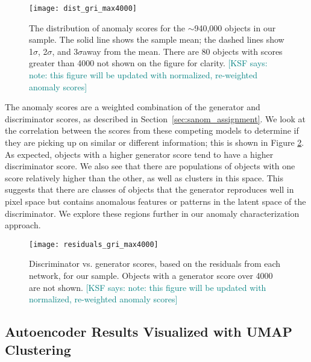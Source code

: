 \documentclass[fleqn,usenatbib,useAMS]{mnras}
\newcommand{\sig}{$\sigma$} %
\newcommand{\KSF}[1]{\textcolor{teal}{{[KSF says: #1]}}}
\begin{document}
\begin{figure}
    \centering
    \texttt{[image: dist\_gri\_max4000]}
    \caption{The distribution of anomaly scores for the $\sim$940,000 objects in our sample. The solid line shows the sample mean; the dashed lines show 1\sig, 2\sig, and 3\sig away from the mean. There are 80 objects with scores greater than 4000 not shown on the figure for clarity. \KSF{note: this figure will be updated with normalized, re-weighted anomaly scores}}
    \label{fig:dist}
\end{figure}

The anomaly scores are a weighted combination of the generator and discriminator scores, as described in Section~\ref{sec:sanom_assignment}.
We look at the correlation between the scores from these competing models to determine if they are picking up on similar or different information; this is shown in Figure \ref{fig:gendisc}.
As expected, objects with a higher generator score tend to have a higher discriminator score.
We also see that there are populations of objects with one score relatively higher than the other, as well as clusters in this space.
This suggests that there are classes of objects that the generator reproduces well in pixel space but contains anomalous features or patterns in the latent space of the discriminator.
We explore these regions further in our anomaly characterization approach.

\begin{figure}
    \centering
    \texttt{[image: residuals\_gri\_max4000]}
    \caption{Discriminator vs. generator scores, based on the residuals from each network, for our sample. Objects with a generator score over 4000 are not shown. \KSF{note: this figure will be updated with normalized, re-weighted anomaly scores}}
    \label{fig:gendisc}
\end{figure}


\subsection{Autoencoder Results Visualized with UMAP Clustering}
\label{sec:cae-umap}
\end{document}
